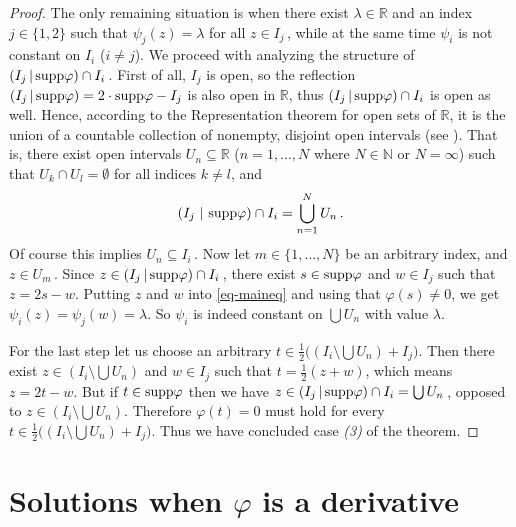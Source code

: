 \documentclass[12pt]{amsart}
\theoremstyle{remark}
\theoremstyle{definition}
\newcommand{\NN}{\mathbb{N}}
\newcommand{\RR}{\mathbb{R}}
\newcommand{\supp}{\mbox{\rm supp}}
\newcommand{\rfl}[2]{\left( #1 \, \vert \, #2 \right)}
\begin{document}
\begin{proof}
The only remaining situation is when there exist 
$ \lambda \in \RR $ and an index 
$ j \in \lbrace 1,2 \rbrace $ such that 
$ \psi_j(z) = \lambda $ for all 
$ z \in I_j \,$, while 
at the same time $ \psi_i $ 
is not constant on $ I_i $ 
($ i \neq j $). 
We proceed with analyzing the structure of 
$ \rfl{I_j}{\supp \varphi} \cap I_i \,$. 
First of all, 
$ I_j $ is open, so the reflection 
$ \rfl{I_j}{\supp \varphi} = 
2 \cdot \supp \varphi - I_j $ 
is also open in $ \RR $, thus 
$ \rfl{I_j}{\supp \varphi} \cap I_i $ 
is open as well. 
Hence, according to the 
Representation theorem for open sets of $ \RR $, 
it is the union of a countable collection of 
nonempty, disjoint open intervals 
(see \cite[Theorem 3.11]{Apo81}). 
That is, there exist open intervals 
$ U_n \subseteq \RR $ 
($ n = 1, \dots ,N $ where 
$ N \in \NN $ or $ N = \infty $) 
such that 
$ U_k \cap U_l = \emptyset $ for all indices 
$ k \neq l $, and 
\[
\rfl{I_j \, }{ \, \supp \varphi } \cap I_i = 
\bigcup_{n = 1}^N U_n \,. 
\]
Of course this implies $ U_n \subseteq I_i \,$. 
Now let 
$ m \in \lbrace 1, \dots, N \rbrace $ be 
an arbitrary index, and $ z \in U_m \,$. 
Since 
$ z \in \rfl{I_j}{\supp \varphi } \cap I_i \,$, 
there exist 
$ s \in \supp \varphi $ and $ w \in I_j $ such that 
$ z = 2s-w $. 
Putting $ z $ and $ w $ into \eqref{eq-maineq} 
and using that $ \varphi (s) \neq 0 $, 
we get 
$ \psi_i (z) = \psi_j(w) = \lambda $. 
So $ \psi_i $ is indeed constant on 
$ \bigcup U_n $ with value $ \lambda $. 

For the last step let us choose an arbitrary 
$ t \in \frac{1}{2} \bigl( 
\left( I_i \setminus \bigcup U_n \right) + I_j 
\bigr) $. Then there exist 
$ z \in \left( I_i \setminus \bigcup U_n \right) $ 
and 
$ w \in I_j $ such that 
$ t = \frac{1}{2}(z+w) $, which means 
$ z = 2t - w $. But if 
$ t \in \supp \varphi $ then we have 
$ z \in \rfl{I_j}{\supp \varphi} \cap I_i = \bigcup U_n \,$, 
opposed to 
$ z \in \left( I_i \setminus \bigcup U_n \right) $. 
Therefore $ \varphi(t) = 0 $ must hold for every 
$ t \in \frac{1}{2} \bigl( 
\left( I_i \setminus \bigcup U_n \right) + I_j 
\bigr) $. 
Thus we have concluded case \emph{(3)} of the theorem. 
\end{proof}

\section{Solutions when $ \varphi $ is a derivative}
\end{document}
